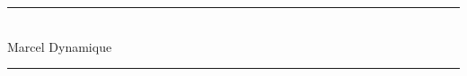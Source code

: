 \begin{titlepage}
\thispagestyle{empty}
\newcommand{\HRule}[2]{\centering\rule{#1}{#2}}
\newlength{\logowidth}
\setlength{\logowidth}{2.5cm}
\newlength{\logohspace}
\setlength{\logohspace}{\linewidth}
\addtolength{\logohspace}{-3\logowidth}

\begin{center}
	

			
	\begin{minipage}{0.8\linewidth}
	\vspace{3cm}
		\HRule{\linewidth}{0.5mm}\\
		\vspace{0.5em}
		\sc\Large
		Marcel Dynamique
		\HRule{\linewidth}{0.5mm}
	\end{minipage}
	\vspace{8cm}

	\large{}
		
	
\end{center}

\end{titlepage}    
